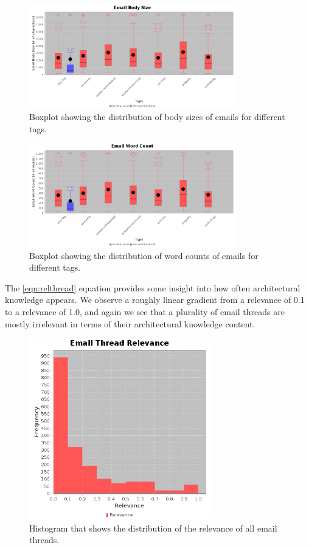 \documentclass[a4paper, 12pt]{article}
\begin{document}
		\begin{figure}[H]
			\centering
			\includegraphics[width=0.8\textwidth]{report/characteristics/body_size.png}
			\caption{Boxplot showing the distribution of body sizes of emails for different tags.}
			\label{fig:bodysize}
		\end{figure}
	
		\begin{figure}[H]
			\centering
			\includegraphics[width=0.8\textwidth]{report/characteristics/word_count.png}
			\caption{Boxplot showing the distribution of word counts of emails for different tags.}
			\label{fig:wordcount}
		\end{figure}
		
		The \eqref{eqn:relthread} equation provides some insight into how often architectural knowledge appears. We observe a roughly linear gradient from a relevance of 0.1 to a relevance of 1.0, and again we see that a plurality of email threads are mostly irrelevant in terms of their architectural knowledge content.
		
		\begin{figure}[H]
			\centering
			\includegraphics[width=0.7\textwidth]{report/overview/relevances.png}
			\caption{Histogram that shows the distribution of the relevance of all email threads.}
			\label{fig:threadrelevance}
		\end{figure}
	
\end{document}
